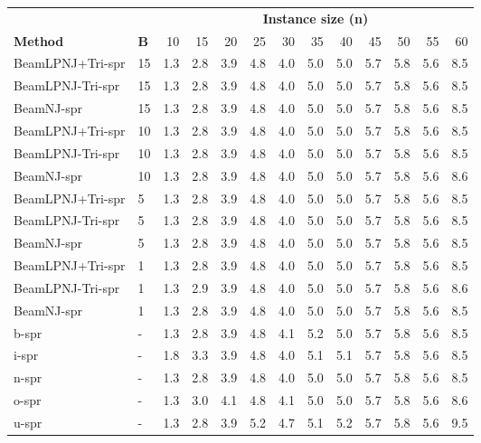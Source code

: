 \begin{tabular}{llrrrrrrrrrrr}
\toprule
&& \multicolumn{11}{c}{\textbf{Instance size (n)}} \\
\cmidrule(lr){3-13}
\textbf{Method} & \textbf{B} & 10 & 15 & 20 & 25 & 30 & 35 & 40 & 45 & 50 & 55 & 60 \\
\midrule
BeamLPNJ+Tri-spr & 15 & 1.3 & 2.8 & 3.9 & 4.8 & 4.0 & 5.0 & 5.0 & 5.7 & 5.8 & 5.6 & 8.5 \\
BeamLPNJ-Tri-spr & 15 & 1.3 & 2.8 & 3.9 & 4.8 & 4.0 & 5.0 & 5.0 & 5.7 & 5.8 & 5.6 & 8.5 \\
BeamNJ-spr & 15 & 1.3 & 2.8 & 3.9 & 4.8 & 4.0 & 5.0 & 5.0 & 5.7 & 5.8 & 5.6 & 8.5 \\
BeamLPNJ+Tri-spr & 10 & 1.3 & 2.8 & 3.9 & 4.8 & 4.0 & 5.0 & 5.0 & 5.7 & 5.8 & 5.6 & 8.5 \\
BeamLPNJ-Tri-spr & 10 & 1.3 & 2.8 & 3.9 & 4.8 & 4.0 & 5.0 & 5.0 & 5.7 & 5.8 & 5.6 & 8.5 \\
BeamNJ-spr & 10 & 1.3 & 2.8 & 3.9 & 4.8 & 4.0 & 5.0 & 5.0 & 5.7 & 5.8 & 5.6 & 8.6 \\
BeamLPNJ+Tri-spr & 5 & 1.3 & 2.8 & 3.9 & 4.8 & 4.0 & 5.0 & 5.0 & 5.7 & 5.8 & 5.6 & 8.5 \\
BeamLPNJ-Tri-spr & 5 & 1.3 & 2.8 & 3.9 & 4.8 & 4.0 & 5.0 & 5.0 & 5.7 & 5.8 & 5.6 & 8.5 \\
BeamNJ-spr & 5 & 1.3 & 2.8 & 3.9 & 4.8 & 4.0 & 5.0 & 5.0 & 5.7 & 5.8 & 5.6 & 8.5 \\
BeamLPNJ+Tri-spr & 1 & 1.3 & 2.8 & 3.9 & 4.8 & 4.0 & 5.0 & 5.0 & 5.7 & 5.8 & 5.6 & 8.5 \\
BeamLPNJ-Tri-spr & 1 & 1.3 & 2.9 & 3.9 & 4.8 & 4.0 & 5.0 & 5.0 & 5.7 & 5.8 & 5.6 & 8.6 \\
BeamNJ-spr & 1 & 1.3 & 2.8 & 3.9 & 4.8 & 4.0 & 5.0 & 5.0 & 5.7 & 5.8 & 5.6 & 8.5 \\
b-spr & - & 1.3 & 2.8 & 3.9 & 4.8 & 4.1 & 5.2 & 5.0 & 5.7 & 5.8 & 5.6 & 8.5 \\
i-spr & - & 1.8 & 3.3 & 3.9 & 4.8 & 4.0 & 5.1 & 5.1 & 5.7 & 5.8 & 5.6 & 8.5 \\
n-spr & - & 1.3 & 2.8 & 3.9 & 4.8 & 4.0 & 5.0 & 5.0 & 5.7 & 5.8 & 5.6 & 8.5 \\
o-spr & - & 1.3 & 3.0 & 4.1 & 4.8 & 4.1 & 5.0 & 5.0 & 5.7 & 5.8 & 5.6 & 8.6 \\
u-spr & - & 1.3 & 2.8 & 3.9 & 5.2 & 4.7 & 5.1 & 5.2 & 5.7 & 5.8 & 5.6 & 9.5 \\
\bottomrule
\end{tabular}
